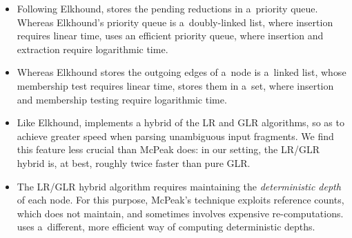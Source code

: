 \begin{itemize}
\item
Following Elkhound, \menhir stores the pending reductions in a~priority queue.
Whereas Elkhound's priority queue is a~doubly-linked list, where insertion
requires linear time, \menhir uses an efficient priority queue, where
insertion and extraction require logarithmic time.

\item
Whereas Elkhound stores the outgoing edges of a~node is a~linked list,
whose membership test requires linear time,
\menhir stores them in a~set,
where insertion and membership testing require logarithmic time.

\item
Like Elkhound, \menhir implements a hybrid of the LR and GLR algorithms,
so as to achieve greater speed when parsing unambiguous input fragments.
We find this feature less crucial than McPeak does: in our setting,
the LR/GLR hybrid is, at best, roughly twice faster than pure GLR.

\item
The LR/GLR hybrid algorithm requires maintaining the \emph{deterministic
depth} of each node. For this purpose, McPeak's technique exploits reference
counts, which \menhir does not maintain, and sometimes involves expensive
re-computations.
\menhir uses a~different, more efficient way of computing
deterministic depths.




\end{itemize}

